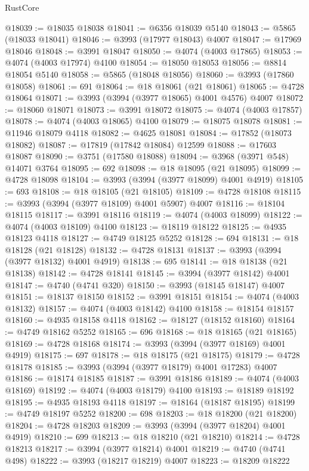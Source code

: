 \begin{lexlean}{RustCore}
\begin{coremodule}
@18039 := @18035 @18038
@18041 := @6356 @18039 @5140
@18043 := @5865 (@18033 @18041)
@18046 := @3993 (@17977 @18043) @4007
@18047 := @17969 @18046
@18048 := @3991 @18047
@18050 := @4074 (@4003 @17865)
@18053 := @4074 (@4003 @17974) @4100
@18054 := @18050 @18053
@18056 := @8814 @18054 @5140
@18058 := @5865 (@18048 @18056)
@18060 := @3993 (@17860 @18058)
@18061 := 691
@18064 := @18 @18061 (@21 @18061)
@18065 := @4728 @18064
@18071 := @3993 (@3994 (@3977 @18065) @4001 @4576) @4007
@18072 := @18060 @18071
@18073 := @3991 @18072
@18075 := @4074 (@4003 @17857)
@18078 := @4074 (@4003 @18065) @4100
@18079 := @18075 @18078
@18081 := @11946 @18079 @4118
@18082 := @4625 @18081
@18084 := @17852 (@18073 @18082)
@18087 := @17819 (@17842 @18084) @12599
@18088 := @17603 @18087
@18090 := @3751 (@17580 @18088)
@18094 := @3968 (@3971 @548) @14071 @3764
@18095 := 692
@18098 := @18 @18095 (@21 @18095)
@18099 := @4728 @18098
@18104 := @3993 (@3994 (@3977 @18099) @4001 @4919)
@18105 := 693
@18108 := @18 @18105 (@21 @18105)
@18109 := @4728 @18108
@18115 := @3993 (@3994 (@3977 @18109) @4001 @5907) @4007
@18116 := @18104 @18115
@18117 := @3991 @18116
@18119 := @4074 (@4003 @18099)
@18122 := @4074 (@4003 @18109) @4100
@18123 := @18119 @18122
@18125 := @4935 @18123 @4118
@18127 := @4749 @18125 @5252
@18128 := 694
@18131 := @18 @18128 (@21 @18128)
@18132 := @4728 @18131
@18137 := @3993 (@3994 (@3977 @18132) @4001 @4919)
@18138 := 695
@18141 := @18 @18138 (@21 @18138)
@18142 := @4728 @18141
@18145 := @3994 (@3977 @18142) @4001
@18147 := @4740 (@4741 @320)
@18150 := @3993 (@18145 @18147) @4007
@18151 := @18137 @18150
@18152 := @3991 @18151
@18154 := @4074 (@4003 @18132)
@18157 := @4074 (@4003 @18142) @4100
@18158 := @18154 @18157
@18160 := @4935 @18158 @4118
@18162 := @18127 (@18152 @18160)
@18164 := @4749 @18162 @5252
@18165 := 696
@18168 := @18 @18165 (@21 @18165)
@18169 := @4728 @18168
@18174 := @3993 (@3994 (@3977 @18169) @4001 @4919)
@18175 := 697
@18178 := @18 @18175 (@21 @18175)
@18179 := @4728 @18178
@18185 := @3993 (@3994 (@3977 @18179) @4001 @17283) @4007
@18186 := @18174 @18185
@18187 := @3991 @18186
@18189 := @4074 (@4003 @18169)
@18192 := @4074 (@4003 @18179) @4100
@18193 := @18189 @18192
@18195 := @4935 @18193 @4118
@18197 := @18164 (@18187 @18195)
@18199 := @4749 @18197 @5252
@18200 := 698
@18203 := @18 @18200 (@21 @18200)
@18204 := @4728 @18203
@18209 := @3993 (@3994 (@3977 @18204) @4001 @4919)
@18210 := 699
@18213 := @18 @18210 (@21 @18210)
@18214 := @4728 @18213
@18217 := @3994 (@3977 @18214) @4001
@18219 := @4740 (@4741 @498)
@18222 := @3993 (@18217 @18219) @4007
@18223 := @18209 @18222

\end{coremodule}
\end{lexlean}

